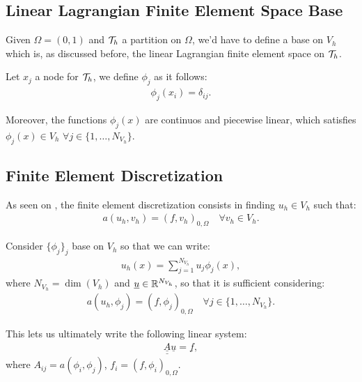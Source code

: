 \subsection{Linear Lagrangian Finite Element Space Base}

Given $\Omega = (0, 1)$ and $\mathcal{T}_h$ a partition on $\Omega$, we'd have to define a base on $V_h$ which is, as discussed before, the linear Lagrangian finite element space on $\mathcal{T}_h$.

Let $x_j$ a node for $\mathcal{T}_h$, we define $\phi_j$ as it follows:
\begin{gather}
	\phi_j(x_i) = \delta_{ij}.
\end{gather}

Moreover, the functions $\phi_j(x)$ are continuos and piecewise linear, which satisfies $\phi_j(x) \in V_h$ $\forall j \in \{1, \dots, N_{V_h}\}$.

\subsection{Finite Element Discretization}

As seen on , the finite element discretization consists in finding $u_h \in V_h$ such that:
\begin{gather}
	a(u_h, v_h) = (f, v_h)_{0, \Omega} \quad \forall v_h \in V_h.
\end{gather}

Consider $\{\phi_j\}_j$ base on $V_h$ so that we can write:
\begin{gather}
	u_h(x) = \sum_{j = 1}^{N_{V_h}} u_j \phi_j(x),
\end{gather}
where $N_{V_h} = \dim(V_h)$ and $\underline{u} \in \mathbb{R}^{N_{V_h}}$, so that it is sufficient considering:
\begin{gather}
	a(u_h, \phi_j) = (f, \phi_j)_{0, \Omega} \quad \forall j \in \{1, \dots, N_{V_h}\}.
\end{gather}

This lets us ultimately write the following linear system:
\begin{gather}
	\underline{\underline{A}} \underline{u} = \underline{f},
\end{gather}
where $A_{ij} = a(\phi_i, \phi_j)$, $f_i = (f, \phi_i)_{0, \Omega}$.